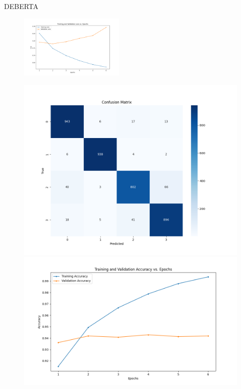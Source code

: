 \documentclass{beamer}
\begin{document}
\begin{frame}{DEBERTA}
  \begin{figure}[H]
    \centering
    \includegraphics[width=5cm]{pictures/DeBERTa/deberta-v2loss_curve.png}
  \end{figure}
  \begin{figure}[htbp]
    \centering
    \begin{minipage}{0.49\linewidth}
      \centering
      \includegraphics[width=0.9\linewidth]{pictures/DeBERTa/deberta-v2confusion_matrix.png}
    \end{minipage}
    \begin{minipage}{0.49\linewidth}
      \centering
      \includegraphics[width=0.9\linewidth]{pictures/DeBERTa/deberta-v2accuracy_curve.png}
    \end{minipage}
  \end{figure}
\end{frame}
\end{document}
